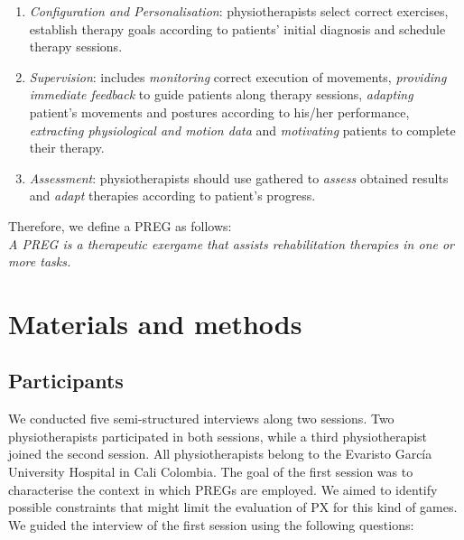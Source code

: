 \begin{enumerate}
    \item \emph{Configuration and Personalisation}: physiotherapists select correct exercises, establish therapy goals according to patients’ initial diagnosis and schedule therapy sessions.
    \item \emph{Supervision}: includes \textit{monitoring} correct execution of movements, \textit{providing immediate feedback} to guide patients along therapy sessions, \textit{adapting} patient’s movements and postures according to his/her performance, \textit{extracting physiological and motion data} and \textit{motivating} patients to complete their therapy.
    \item \emph{Assessment}: physiotherapists should use gathered to \textit{assess} obtained results and \textit{adapt} therapies according to patient’s progress.
\end{enumerate}

Therefore, we define a \ac{PREG} as follows:\\

\emph{A \ac{PREG} is a therapeutic exergame that assists rehabilitation therapies in one or more tasks.}

\section{Materials and methods} %
\label{sec:mats_mets_char}
\subsection{Participants}
We conducted five semi-structured interviews along two sessions. Two physiotherapists participated in both sessions, while a third physiotherapist joined the second session. All physiotherapists belong to the Evaristo Garc\'ia University Hospital in Cali Colombia. The goal of the first session was to characterise the context in which \acp{PREG} are employed. We aimed to identify possible constraints that might limit the evaluation of \ac{PX} for this kind of games. We guided the interview of the first session using the following questions:

